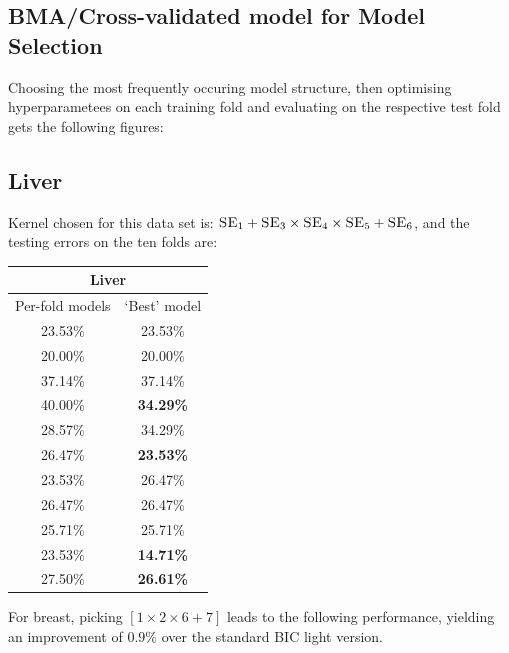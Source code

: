 \documentclass[a4paper,12pt ]{report}
\begin{document}
\clearpage

\subsection{BMA/Cross-validated model for Model Selection}

Choosing the most frequently occuring model structure, then optimising hyperparametees on each training fold and evaluating on the respective test fold gets the following figures:

\subsection{Liver}

Kernel chosen for this data set is: $ \textsc{SE}_1 + \textsc{SE}_3 \times \textsc{SE}_4 \times \textsc{SE}_5 + \textsc{SE}_6 $, and the testing errors on the ten folds are: 

\begin{table}[h]

  \begin{tabular}{|c | c  | }
      \hline
      \multicolumn{2}{|c|}{Liver}  \\
      \hline
      Per-fold models & `Best' model \\  \hline
23.53\%	& 23.53\% \\ 
20.00\%	& 20.00\% \\
37.14\%	& 37.14\% \\
40.00\%	& \textbf{34.29\%} \\
28.57\%	& 34.29\% \\
26.47\%	& \textbf{23.53\%} \\
23.53\%	& 26.47\% \\
26.47\%	& 26.47\% \\
25.71\%	& 25.71\% \\
23.53\%	& \textbf{14.71\%} \\ \hline \hline
27.50\%	& \textbf{26.61\%} \\

      \hline 
      \end{tabular}
\end{table}


For breast, picking $ [ 1 \times 2 \times 6 + 7 ] $ leads to the following performance, yielding an improvement of $0.9\%$ over the standard BIC light version. 
\end{document}
